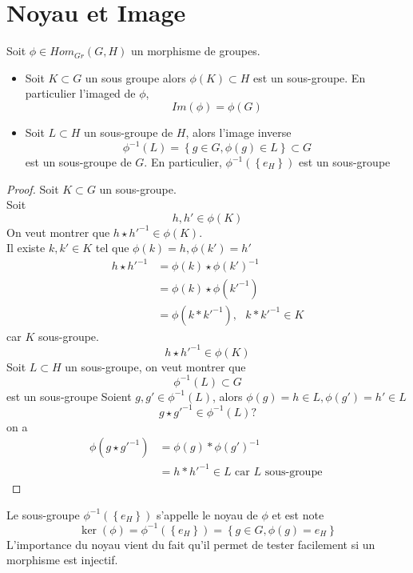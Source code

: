 \documentclass[../main.tex]{subfiles}
\begin{document}

\section{Noyau et Image}

\begin{propo}
	Soit $\phi \in Hom_{Gr} ( G,H) $ un morphisme de groupes.
	\begin{itemize}
		\item Soit $K\subset G$ un sous groupe alors $\phi(K) \subset H$ est un sous-groupe. En particulier l'imaged de $\phi$,
			\[ 
				Im(\phi) = \phi(G)
			\]
			
		\item Soit $L \subset H$ un sous-groupe de $H$, alors l'image inverse
			\[ 
				\phi^{-1}(L) = \left\{ g \in G, \phi(g) \in L \right\} \subset G
			\]
			est un sous-groupe de $G$. En particulier, $\phi^{-1}( \left\{ e_H \right\})$ est un sous-groupe
	\end{itemize}
	
\end{propo}
\begin{proof}
Soit $K \subset G$ un sous-groupe.\\
Soit
\[ 
	h,h' \in \phi(K)
\]
On veut montrer que $h\star h'^{-1}\in \phi(K)$.\\
Il existe $k,k' \in K$ tel que $\phi(k)=h, \phi(k')=h'$ 
\begin{align*}
	h \star h'^{-1} &= \phi(k) \star \phi(k')^{-1}\\
			&=\phi(k) \star \phi(k'^{-1})\\
			&= \phi(k\ast k'^{-1}), \text{     } k\ast k'^{-1} \in K
\end{align*}
car $K$ sous-groupe.\\
\[ 
	h \star h'^{-1} \in \phi(K)
\]
Soit $L \subset H$ un sous-groupe, on veut montrer que
\[ 
	\phi^{-1}(L) \subset G
\]
est un sous-groupe
Soient $g,g' \in \phi^{-1}(L)$, alors $\phi(g) = h \in L, \phi(g') = h' \in L$\\
 \[ 
	 g\star g'^{-1} \in \phi^{-1}(L)?
\]
on a
\begin{align*}
	\phi(g \star g'^{-1}) &= \phi(g) \ast \phi(g')^{-1}\\
			      &=h \ast h'^{-1} \in L \text{ car $L$ sous-groupe } 
\end{align*}
\end{proof}
\begin{defn}
	Le sous-groupe $\phi^{-1}( \left\{ e_H \right\} )$ s'appelle le noyau de $\phi$ et est note
	\[ 
		\ker(\phi) = \phi^{-1}( \left\{ e_H \right\} ) = \left\{ g\in G, \phi(g) = e_H \right\} 
	\]
	L'importance du noyau vient du fait qu'il permet de tester facilement si un morphisme est injectif.
\end{defn}
\end{document}
